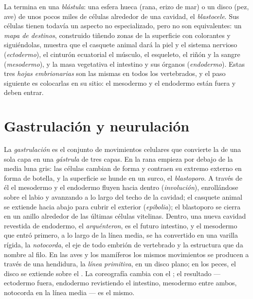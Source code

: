 \begin{definition}[Blástula]\label{def:b2:vertebrate-development:blastula}
La  termina en una \emph{blástula}: una esfera hueca (rana,
erizo de mar) o un disco (pez, ave) de unos pocos miles de células
alrededor de una cavidad, el \emph{blastocele}. Sus células tienen todavía
un aspecto no especializado, pero no son equivalentes: un \emph{mapa de
destinos}, construido tiñendo zonas de la superficie con colorantes y
siguiéndolas, muestra que el casquete animal dará la piel y el sistema
nervioso (\emph{ectodermo}), el cinturón ecuatorial el músculo, el
esqueleto, el riñón y la sangre (\emph{mesodermo}), y la masa vegetativa
el intestino y sus órganos (\emph{endodermo}). Estas tres \emph{hojas
embrionarias} son las mismas en todos los vertebrados, y el paso
siguiente es colocarlas en su sitio: el mesodermo y el endodermo están
fuera y deben entrar.
\end{definition}

\section{Gastrulación y neurulación}

\begin{proposition}[La gastrulación]\label{prop:b2:vertebrate-development:gastrulation}
La \emph{gastrulación} es el conjunto de movimientos celulares que
convierte la  de una sola capa en una \emph{gástrula} de tres
capas. En la rana empieza por debajo de la media luna gris: las células
cambian de forma y contraen su extremo externo en forma de botella, y la
superficie se hunde en un surco, el \emph{blastoporo}. A través de él el
mesodermo y el endodermo fluyen hacia dentro (\emph{involución}),
enrollándose sobre el labio y avanzando a lo largo del techo de la
cavidad; el casquete animal se extiende hacia abajo para cubrir el
exterior (\emph{epibolia}); el blastoporo se cierra en un anillo alrededor
de las últimas células vitelinas. Dentro, una nueva cavidad revestida de
endodermo, el \emph{arquénteron}, es el futuro intestino, y el mesodermo
que entró primero, a lo largo de la línea media, se ha convertido en una
varilla rígida, la \emph{notocorda}, el eje de todo embrión de vertebrado
y la estructura que da nombre al filo. En las aves y los mamíferos los
mismos movimientos se producen a través de una hendidura, la
\emph{línea primitiva}, en un disco plano; en los peces, el disco se
extiende sobre el . La coreografía cambia con el ; el
resultado --- ectodermo fuera, endodermo revistiendo el intestino,
mesodermo entre ambos, notocorda en la línea media --- es el mismo.
\end{proposition}

